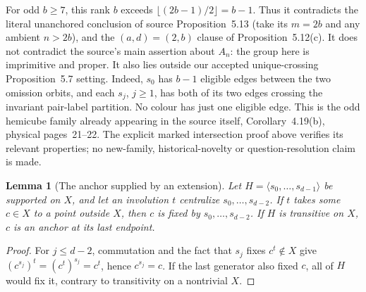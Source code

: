 \documentclass[11pt,a4paper]{article}
\newtheorem{lemma}[theorem]{Lemma}
\newcommand{\gen}[1]{\langle#1\rangle}
\begin{document}
For odd $b\geq7$, this rank $b$ exceeds
$\lfloor(2b-1)/2\rfloor=b-1$. Thus it contradicts the literal
unanchored conclusion of source Proposition~5.13 (take its
$m=2b$ and any ambient $n>2b$), and the
$(a,d)=(2,b)$ clause of Proposition~5.12(c). It does not
contradict the source's main assertion about $A_n$: the group
here is imprimitive and proper. It also lies outside our
accepted unique-crossing Proposition~5.7 setting. Indeed,
$s_0$ has $b-1$ eligible edges between the two omission orbits,
and each $s_j$, $j\geq1$, has both of its two edges crossing
the invariant pair-label partition. No colour has just one
eligible edge. This is the odd hemicube family already appearing in the source
itself, Corollary~4.19(b), physical pages~21--22. The explicit
marked intersection proof above verifies its relevant properties;
no new-family, historical-novelty or question-resolution claim is made.

\begin{lemma}[The anchor supplied by an extension]
Let $H=\gen{s_0,\ldots,s_{d-1}}$ be supported on $X$, and let
an involution $t$ centralize $s_0,\ldots,s_{d-2}$. If $t$ takes
some $c\in X$ to a point outside $X$, then $c$ is fixed by
$s_0,\ldots,s_{d-2}$. If $H$ is transitive on $X$, $c$ is an
anchor at its last endpoint.
\end{lemma}
\begin{proof}
For $j\leq d-2$, commutation and the fact that $s_j$ fixes
$c^t\notin X$ give $(c^{s_j})^t=(c^t)^{s_j}=c^t$, hence
$c^{s_j}=c$. If the last generator also fixed $c$, all of
$H$ would fix it, contrary to transitivity on a nontrivial $X$.
\end{proof}
\end{document}
